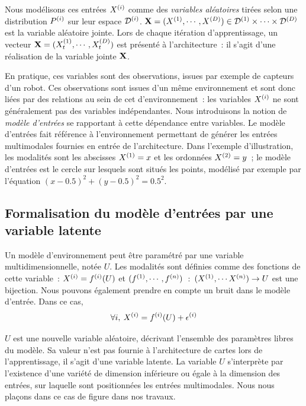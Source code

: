 \documentclass[../main]{subfiles}
\begin{document}
Nous modélisons ces entrées $X^{({i})}$ comme des \emph{variables aléatoires} tirées selon une distribution $P^{({i})}$ sur leur espace $\mathcal{D}^{({i})}$.
$\mathbf{X} = (X^{({1})}, \cdots, X^{({D})}) \in \mathcal{D}^{({1})} \times \cdots \times \mathcal{D}^{({D})}$ est la variable aléatoire jointe. 
Lors de chaque itération d'apprentissage, un vecteur $\mathbf{X} = (X^{({1})}_t, \cdots , X^{({D})}_t)$ est présenté à l'architecture~: il s'agit d'une réalisation de la variable jointe $\mathbf{X}$.


En pratique, ces variables sont des observations, issues par exemple de capteurs d'un robot. Ces observations sont issues d'un même environnement et sont donc liées par des relations au sein de cet d'environnement~: les variables $X^{({i})}$ ne sont généralement pas des variables indépendantes.
Nous introduisons la notion de \emph{modèle d'entrées} se rapportant à cette dépendance entre variables.
Le modèle d'entrées fait référence à l'environnement permettant de générer les entrées multimodales fournies en entrée de l'architecture. Dans l'exemple d'illustration, les modalités sont les abscisses $X^{({1})} = x$ et les ordonnées $X^{({2})} = y$~; le modèle d'entrées est le cercle sur lesquels sont situés les points, modélisé par exemple par l'équation $(x - 0.5)^2 + (y - 0.5)^2 = 0.5^2$.

\subsection{Formalisation du modèle d'entrées par une variable latente}

Un modèle d'environnement peut être paramétré par une variable multidimensionnelle, notée $U$. 
Les modalités sont définies comme des fonctions de cette variable~:
$X^{({i})} = f^{({i})}(U)$
et $(f^{({1})}, \cdots, f^{({n})})$~:~$(X^{({1})}, \cdots X^{({n})})\rightarrow U$ est une bijection.
Nous pouvons également prendre en compte un bruit dans le modèle d'entrée. 
Dans ce cas, 
\begin{equation}
    \forall i, \: X^{({i})} = f^{({i})}(U) + \epsilon^{({i})}
\end{equation}

$U$ est une nouvelle variable aléatoire, décrivant l'ensemble des paramètres libres du modèle. 
Sa valeur n'est pas fournie à l'architecture de cartes lors de l'apprentissage, il s'agit d'une variable latente.
La variable $U$ s'interprète par l'existence d'une variété de dimension inférieure ou égale à la dimension des entrées, sur laquelle sont positionnées les entrées multimodales. Nous nous plaçons dans ce cas de figure dans nos travaux.
\end{document}
